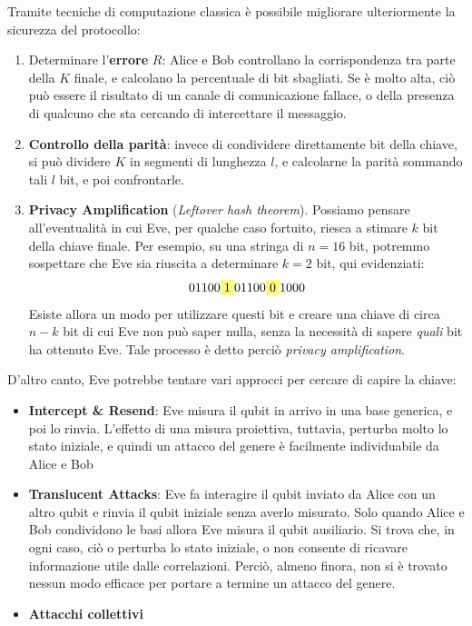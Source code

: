\documentclass[../../InformazioneQuantistica.tex]{subfiles}
\begin{document}
Tramite tecniche di computazione classica è possibile migliorare ulteriormente la sicurezza del protocollo:
\begin{enumerate}
\item Determinare l'\textbf{errore} $R$: Alice e Bob controllano la corrispondenza tra parte della $K$ finale, e calcolano la percentuale di bit sbagliati. Se è molto alta, ciò può essere il risultato di un canale di comunicazione fallace, o della presenza di qualcuno che sta cercando di intercettare il messaggio.
\item \textbf{Controllo della parità}: invece di condividere direttamente bit della chiave, si può dividere $K$ in segmenti di lunghezza $l$, e calcolarne la parità sommando tali $l$ bit, e poi confrontarle.
\item \textbf{Privacy Amplification} (\textit{Leftover hash theorem}). Possiamo pensare all'eventualità in cui Eve, per qualche caso fortuito, riesca a stimare $k$ bit della chiave finale. Per esempio, su una stringa di $n=16$ bit, potremmo sospettare che Eve sia riuscita a determinare $k=2$ bit, qui evidenziati:
\begin{align*}
01100\hlc{Yellow}{1}01100\hlc{Yellow}{0}1000
\end{align*}
Esiste allora un modo per utilizzare questi bit e creare una chiave di circa $n-k$ bit di cui Eve non può saper nulla, senza la necessità di sapere \textit{quali} bit ha ottenuto Eve. Tale processo è detto perciò \textit{privacy amplification}.
\end{enumerate}

D'altro canto, Eve potrebbe tentare vari approcci per cercare di capire la chiave:
\begin{itemize}
\item \textbf{Intercept \& Resend}: Eve misura il qubit in arrivo in una base generica, e poi lo rinvia. L'effetto di una misura proiettiva, tuttavia, perturba molto lo stato iniziale, e quindi un attacco del genere è facilmente individuabile da Alice e Bob
\item \textbf{Translucent Attacks}: Eve fa interagire il qubit inviato da Alice con un altro qubit  e rinvia il qubit iniziale senza averlo misurato. Solo quando Alice e Bob condividono le basi allora Eve misura il qubit ausiliario. Si trova che, in ogni caso, ciò o perturba lo stato iniziale, o non consente di ricavare informazione utile dalle correlazioni. Perciò, almeno finora, non si è trovato nessun modo efficace per portare a termine un attacco del genere.
\item \textbf{Attacchi collettivi} 
\end{itemize}
\end{document}
